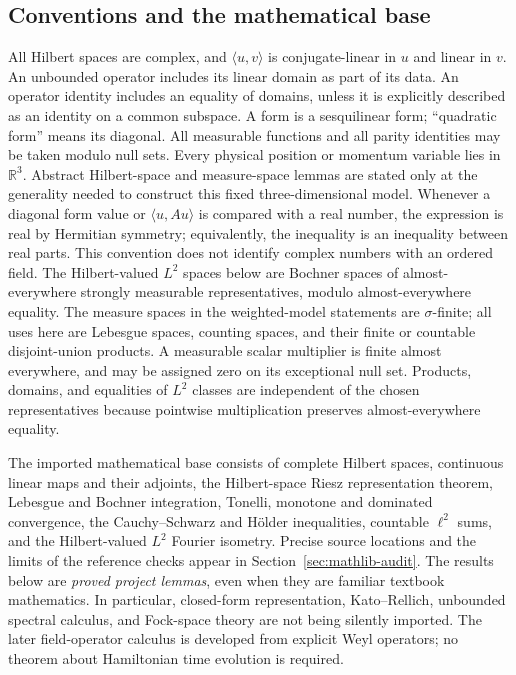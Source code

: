 \documentclass[11pt,a4paper]{article}
\theoremstyle{definition}
\theoremstyle{remark}
\begin{document}
\subsection{Conventions and the mathematical base}

All Hilbert spaces are complex, and $\langle u,v\rangle$ is conjugate-linear in
$u$ and linear in $v$. An unbounded operator includes its linear domain as part
of its data. An operator identity includes an equality of domains, unless it is
explicitly described as an identity on a common subspace. A form is a
sesquilinear form; ``quadratic form'' means its diagonal. All measurable
functions and all parity identities may be taken modulo null sets. Every
physical position or momentum variable lies in $\mathbb R^3$. Abstract
Hilbert-space and measure-space lemmas are stated only at the generality
needed to construct this fixed three-dimensional model.
Whenever a diagonal form value or $\langle u,Au\rangle$ is compared with a
real number, the expression is real by Hermitian symmetry; equivalently,
the inequality is an inequality between real parts. This convention does
not identify complex numbers with an ordered field. The Hilbert-valued
$L^2$ spaces below are Bochner spaces of almost-everywhere strongly
measurable representatives, modulo almost-everywhere equality. The measure
spaces in the weighted-model statements are $\sigma$-finite; all uses here
are Lebesgue spaces, counting spaces, and their finite or countable
disjoint-union products. A measurable scalar multiplier is finite almost
everywhere, and may be assigned zero on its exceptional null set. Products,
domains, and equalities of $L^2$ classes are independent of the chosen
representatives because pointwise multiplication preserves
almost-everywhere equality.

The imported mathematical base consists of complete Hilbert spaces, continuous
linear maps and their adjoints, the Hilbert-space Riesz representation theorem,
Lebesgue and Bochner integration, Tonelli, monotone and dominated convergence,
the Cauchy--Schwarz and H\"older inequalities, countable $\ell^2$ sums, and the
Hilbert-valued $L^2$ Fourier isometry. Precise source locations and the limits of
the reference checks appear in Section~\ref{sec:mathlib-audit}. The results below
are \emph{proved project lemmas}, even when they are
familiar textbook mathematics. In particular, closed-form representation,
Kato--Rellich, unbounded spectral calculus, and Fock-space theory are not
being silently imported. The later field-operator calculus is developed
from explicit Weyl operators; no theorem about Hamiltonian time evolution
is required.
\end{document}
